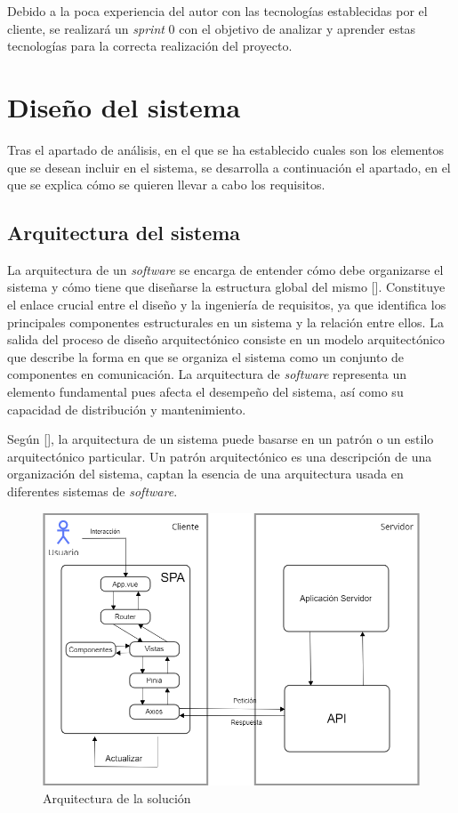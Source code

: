 Debido a la poca experiencia del autor con las tecnologías establecidas por el cliente, se realizará un \textit{sprint} 0 con el objetivo de analizar y aprender estas tecnologías para la correcta realización del proyecto.

\section{Diseño del sistema}
Tras el apartado de análisis, en el que se ha establecido cuales son los elementos que se desean incluir en el sistema, se desarrolla a continuación el apartado, en el que se explica cómo se quieren llevar a cabo los requisitos.

\subsection{Arquitectura del sistema}
La arquitectura de un \textit{software} se encarga de entender cómo debe organizarse el sistema y cómo tiene que diseñarse la estructura global del mismo [\cite{91}]. Constituye el enlace crucial entre el diseño y la ingeniería de requisitos, ya que identifica los principales componentes estructurales en un sistema y la relación entre ellos. La salida del proceso de diseño arquitectónico consiste en un modelo arquitectónico que describe la  forma en que se organiza el sistema como un conjunto de componentes en comunicación. La arquitectura de \textit{software} representa un elemento fundamental pues afecta el desempeño del sistema, así como su capacidad de distribución y mantenimiento.

Según [\cite{99}], la arquitectura de un sistema puede basarse en un patrón o un estilo arquitectónico particular. Un patrón arquitectónico es una descripción de una organización del sistema, captan la esencia de una arquitectura usada en diferentes sistemas de \textit{software}.

\begin{figure}[htbp]
\centering
\includegraphics[width=\textwidth]{Graphics/mySPAtt}
\caption{Arquitectura de la solución}
\label{fig:spa}
\end{figure}

